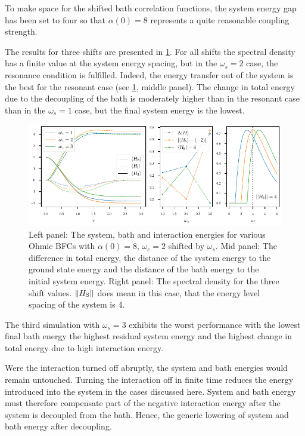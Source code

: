 To make space for the shifted bath correlation functions, the system
energy gap has been set to four so that \(α(0)=8\) represents a quite
reasonable coupling strength.

The results for three shifts are presented in
\cref{fig:resonance_analysis}. For all shifts the spectral density has
a finite value at the system energy spacing, but in the \(ω_s=2\)
case, the resonance condition is fulfilled. Indeed, the energy
transfer out of the system is the best for the resonant case (see
\cref{fig:resonance_analysis}, middle panel). The change in total
energy due to the decoupling of the bath is moderately higher than in
the resonant case than in the \(ω_s=1\) case, but the final system
energy is the lowest. 
\begin{figure}[hp]
  \centering
  \includegraphics{figs/one_bath_syst/resonance_analysis}
  \caption{\label{fig:resonance_analysis} Left
    panel: The system, bath and interaction energies for various Ohmic
    BFCs with \(α(0)=8,\,ω_c=2\) shifted by \(ω_s\). Mid panel: The
    difference in total energy, the distance of the system energy to
    the ground state energy and the distance of the bath energy to the
    initial system energy. Right panel: The spectral density for the
    three shift values. \(\norm{H_{\mathrm{S}}}\) does mean in this case, that
    the energy level spacing of the system is \(4\).}
\end{figure}

The third simulation with \(ω_s=3\) exhibits the worst performance
with the lowest final bath energy the highest residual system energy
and the highest change in total energy due to high interaction
energy.

Were the interaction turned off abruptly, the system and bath energies
would remain untouched. Turning the interaction off in finite time
reduces the energy introduced into the system in the cases discussed
here. System and bath energy must therefore compensate part of the
negative interaction energy after the system is decoupled from the
bath. Hence, the generic lowering of system and bath energy after
decoupling.

